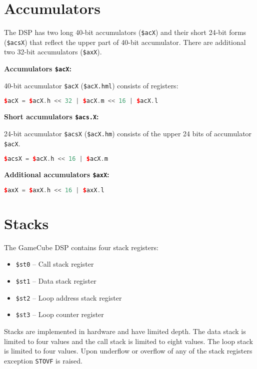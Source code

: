 \documentclass[oneside,english,a4paper,10pt,oneside,openany,final]{memoir}
\newcommand{\Exception}[1]{\texttt{#1}}
\newcommand{\Register}[1]{\texttt{#1}}
\begin{document}
\section{Accumulators}

The DSP has two long 40-bit accumulators (\Register{\$acX}) and their short 24-bit forms (\Register{\$acsX}) that reflect the
upper part of 40-bit accumulator. There are additional two 32-bit accumulators (\Register{\$axX}).

\textbf{Accumulators \Register{\$acX}:}

40-bit accumulator \Register{\$acX} (\Register{\$acX.hml}) consists of registers:

\begin{lstlisting}[language=C++]
$acX = $acX.h << 32 | $acX.m << 16 | $acX.l
\end{lstlisting}

\textbf{Short accumulators \Register{\$acs.X}:}

24-bit accumulator \Register{\$acsX} (\Register{\$acX.hm}) consists of the upper 24 bits of accumulator \Register{\$acX}.

\begin{lstlisting}[language=C++]
$acsX = $acX.h << 16 | $acX.m
\end{lstlisting}

\textbf{Additional accumulators \Register{\$axX}:}

\begin{lstlisting}[language=C++]
$axX = $axX.h << 16 | $axX.l
\end{lstlisting}

\pagebreak{}

\section{Stacks}

The GameCube DSP contains four stack registers:

\begin{itemize}
  \item \Register{\$st0} -- Call stack register
  \item \Register{\$st1} -- Data stack register
  \item \Register{\$st2} -- Loop address stack register
  \item \Register{\$st3} -- Loop counter register
\end{itemize}

Stacks are implemented in hardware and have limited depth. The data stack is limited to four values
and the call stack is limited to eight values. The loop stack is limited to four values.
Upon underflow or overflow of any of the stack registers exception \Exception{STOVF} is raised.
\end{document}
